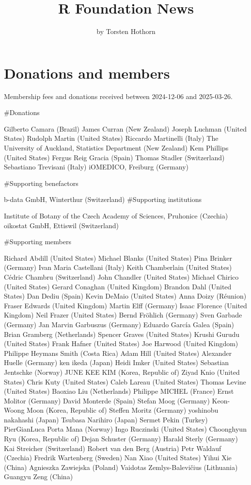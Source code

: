 \title{R Foundation News}


\author{by Torsten Hothorn}

\maketitle


\hypertarget{donations-and-members}{%
\section{Donations and members}\label{donations-and-members}}

Membership fees and donations received between
2024-12-06 and 2025-03-26.

\#Donations

Gilberto Camara (Brazil)
James Curran (New Zealand)
Joseph Luchman (United States)
Rudolph Martin (United States)
Riccardo Martinelli (Italy)
The University of Auckland, Statistics Department (New Zealand)
Kem Phillips (United States)
Fergus Reig Gracia (Spain)
Thomas Stadler (Switzerland)
Sebastiano Trevisani (Italy)
iOMEDICO, Freiburg (Germany)

\#Supporting benefactors

b-data GmbH, Winterthur (Switzerland)
\#Supporting institutions

Institute of Botany of the Czech Academy of Sciences, Pruhonice (Czechia)
oikostat GmbH, Ettiswil (Switzerland)

\#Supporting members

Richard Abdill (United States)
Michael Blanks (United States)
Pina Brinker (Germany)
Ivan Maria Castellani (Italy)
Keith Chamberlain (United States)
Cédric Chambru (Switzerland)
John Chandler (United States)
Michael Chirico (United States)
Gerard Conaghan (United Kingdom)
Brandon Dahl (United States)
Dan Dediu (Spain)
Kevin DeMaio (United States)
Anna Doizy (Réunion)
Fraser Edwards (United Kingdom)
Martin Elff (Germany)
Isaac Florence (United Kingdom)
Neil Frazer (United States)
Bernd Fröhlich (Germany)
Sven Garbade (Germany)
Jan Marvin Garbuszus (Germany)
Eduardo García Galea (Spain)
Brian Gramberg (Netherlands)
Spencer Graves (United States)
Krushi Gurudu (United States)
Frank Hafner (United States)
Joe Harwood (United Kingdom)
Philippe Heymans Smith (Costa Rica)
Adam Hill (United States)
Alexander Huelle (Germany)
ken ikeda (Japan)
Heidi Imker (United States)
Sebastian Jentschke (Norway)
JUNE KEE KIM (Korea, Republic of)
Ziyad Knio (United States)
Chris Kuty (United States)
Caleb Lareau (United States)
Thomas Levine (United States)
Baoxiao Liu (Netherlands)
Philippe MICHEL (France)
Ernst Molitor (Germany)
David Monterde (Spain)
Stefan Moog (Germany)
Keon-Woong Moon (Korea, Republic of)
Steffen Moritz (Germany)
yoshinobu nakahashi (Japan)
Tsubasa Narihiro (Japan)
Sermet Pekin (Turkey)
PierGianLuca Porta Mana (Norway)
Ingo Ruczinski (United States)
Choonghyun Ryu (Korea, Republic of)
Dejan Schuster (Germany)
Harald Sterly (Germany)
Kai Streicher (Switzerland)
Robert van den Berg (Austria)
Petr Waldauf (Czechia)
Fredrik Wartenberg (Sweden)
Nan Xiao (United States)
Yihui Xie (China)
Agnieszka Zawiejska (Poland)
Vaidotas Zemlys-Balevičius (Lithuania)
Guangyu Zeng (China)



